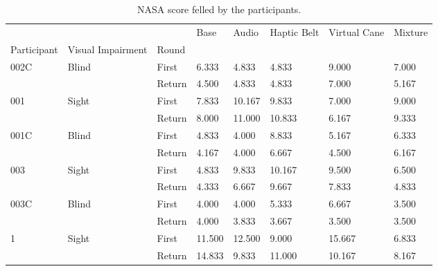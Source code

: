 
\begin{table}[!htb]
\centering
\caption{NASA score felled by the participants.}
\label{tab:nasa_table}
\begin{tabular}{llllllll}
\toprule
  &       &        &   Base &  Audio & Haptic Belt & Virtual Cane & Mixture \\
Participant & Visual Impairment & Round &        &        &             &              &         \\
\midrule
002C & Blind & First &  6.333 &  4.833 &       4.833 &        9.000 &   7.000 \\
  &       & Return &  4.500 &  4.833 &       4.833 &        7.000 &   5.167 \\
001 & Sight & First &  7.833 & 10.167 &       9.833 &        7.000 &   9.000 \\
  &       & Return &  8.000 & 11.000 &      10.833 &        6.167 &   9.333 \\
001C & Blind & First &  4.833 &  4.000 &       8.833 &        5.167 &   6.333 \\
  &       & Return &  4.167 &  4.000 &       6.667 &        4.500 &   6.167 \\
003 & Sight & First &  4.833 &  9.833 &      10.167 &        9.500 &   6.500 \\
  &       & Return &  4.333 &  6.667 &       9.667 &        7.833 &   4.833 \\
003C & Blind & First &  4.000 &  4.000 &       5.333 &        6.667 &   3.500 \\
  &       & Return &  4.000 &  3.833 &       3.667 &        3.500 &   3.500 \\
1 & Sight & First & 11.500 & 12.500 &       9.000 &       15.667 &   6.833 \\
  &       & Return & 14.833 &  9.833 &      11.000 &       10.167 &   8.167 \\
\bottomrule
\end{tabular}
\end{table}

